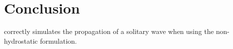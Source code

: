 %
\section{Conclusion}
%
 correctly simulates the propagation of a solitary wave when using the non-hydrostatic formulation.
